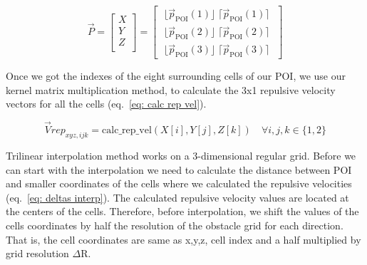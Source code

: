 \documentclass[letterpaper, 10 pt, conference]{ieeeconf}  %
\begin{document}
\begin{equation}
	\label{eq:floor and ceil}
	\vec{P} =
	\begin{bmatrix}
		X \\
		Y \\
		Z \\
	\end{bmatrix}
	=
	\begin{bmatrix}
		\; \lfloor \vec{p}_{\mathrm{POI}}(1) \rfloor \; \lceil \vec{p}_{\mathrm{POI}}(1) \rceil \;  \\
		\; \lfloor \vec{p}_{\mathrm{POI}}(2) \rfloor \; \lceil \vec{p}_{\mathrm{POI}}(2) \rceil \; \\
		\; \lfloor \vec{p}_{\mathrm{POI}}(3) \rfloor \; \lceil \vec{p}_{\mathrm{POI}}(3) \rceil \; 
	\end{bmatrix}
\end{equation}

Once we got the indexes of the eight surrounding cells of our POI, we use our kernel matrix multiplication method, to calculate the 3x1 repulsive velocity vectors for all the cells (eq.~\ref{eq: calc rep vel}).

\begin{equation}
	\label{eq: calc rep vel}
	\vec{V}rep_{xyz,ijk} = \mathrm{calc\_rep\_vel}(X[i], Y[j], Z[k]) \quad \forall i, j, k \in \{1, 2\}
\end{equation}

Trilinear interpolation method works on a 3-dimensional regular grid. Before we can start with the interpolation we need to calculate the distance between POI and smaller coordinates of the cells where we calculated the repulsive velocities (eq.~\ref{eq: deltas interp}). The calculated repulsive velocity values are located at the centers of the cells. Therefore, before interpolation, we shift the values of the cells coordinates by half the resolution of the obstacle grid for each direction. That is, the cell coordinates are same as x,y,z, cell index and a half multiplied by grid resolution $\Delta \mathrm{R}$.

%
%
\end{document}
